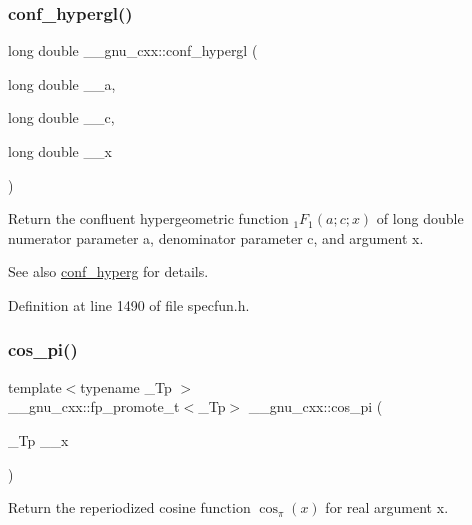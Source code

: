 \subsubsection{\texorpdfstring{conf\+\_\+hypergl()}{conf\_hypergl()}}
{\footnotesize\ttfamily long double \+\_\+\+\_\+gnu\+\_\+cxx\+::conf\+\_\+hypergl (\begin{DoxyParamCaption}\item[{long double}]{\+\_\+\+\_\+a,  }\item[{long double}]{\+\_\+\+\_\+c,  }\item[{long double}]{\+\_\+\+\_\+x }\end{DoxyParamCaption})\hspace{0.3cm}{\ttfamily [inline]}}

Return the confluent hypergeometric function $ {}_1F_1(a;c;x) $ of {\ttfamily long double} numerator parameter {\ttfamily a}, denominator parameter {\ttfamily c}, and argument {\ttfamily x}.

\begin{DoxySeeAlso}{See also}
\hyperlink{group__mathsf__gnu_ga4d01e85e7d295afca5d9f8b6c68f19cc}{conf\+\_\+hyperg} for details. 
\end{DoxySeeAlso}


Definition at line 1490 of file specfun.\+h.

\mbox{\label{group__mathsf__gnu_gafc4698ae591b0e9e61285b0794d43ef4}} 
\subsubsection{\texorpdfstring{cos\+\_\+pi()}{cos\_pi()}}
{\footnotesize\ttfamily template$<$typename \+\_\+\+Tp $>$ \\
\+\_\+\+\_\+gnu\+\_\+cxx\+::fp\+\_\+promote\+\_\+t$<$\+\_\+\+Tp$>$ \+\_\+\+\_\+gnu\+\_\+cxx\+::cos\+\_\+pi (\begin{DoxyParamCaption}\item[{\+\_\+\+Tp}]{\+\_\+\+\_\+x }\end{DoxyParamCaption})\hspace{0.3cm}{\ttfamily [inline]}}

Return the reperiodized cosine function $ \cos_\pi(x) $ for real argument {\ttfamily x}.

